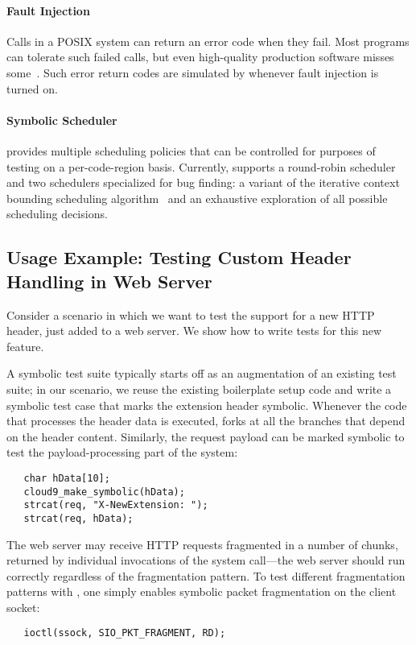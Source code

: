 \paragraph{Fault Injection}

Calls in a POSIX system can return an error code when they fail.
%
Most programs can tolerate such failed calls, but even high-quality production software misses some~\cite{lfi}. Such error return codes are simulated by \cnine whenever fault injection is turned on. 

\paragraph{Symbolic Scheduler}

\cnine provides multiple scheduling policies that can be controlled for purposes of testing on a per-code-region basis.
%
Currently, \cnine supports a round-robin scheduler and two schedulers specialized for bug finding: a variant of the iterative context bounding scheduling algorithm~\cite{chess} and an exhaustive exploration of all possible scheduling decisions.  


\subsection{Usage Example: Testing Custom Header Handling in Web Server}

Consider a scenario in which we want to test the support for a new  HTTP header, just added to a web server.
%
We show how to write tests for this new feature.

A symbolic test suite typically starts off as an augmentation of an existing test suite;
%
in our scenario, we reuse the existing boilerplate setup code and write a symbolic test case that marks the extension header symbolic. Whenever the code that processes the header data is executed, \cnine forks at all the branches that depend on the header content. Similarly, the request payload can be marked symbolic to test the payload-processing part of the system:

\begin{verbatim}
   char hData[10];
   cloud9_make_symbolic(hData);
   strcat(req, "X-NewExtension: ");
   strcat(req, hData);
\end{verbatim}

The web server may receive HTTP requests fragmented in a number of chunks, returned by individual invocations of the  system call---the web server should run correctly regardless of the fragmentation pattern.
%
To test different fragmentation patterns with \cnine, one simply enables symbolic packet fragmentation on the client socket:
\begin{verbatim}
   ioctl(ssock, SIO_PKT_FRAGMENT, RD);
\end{verbatim}


